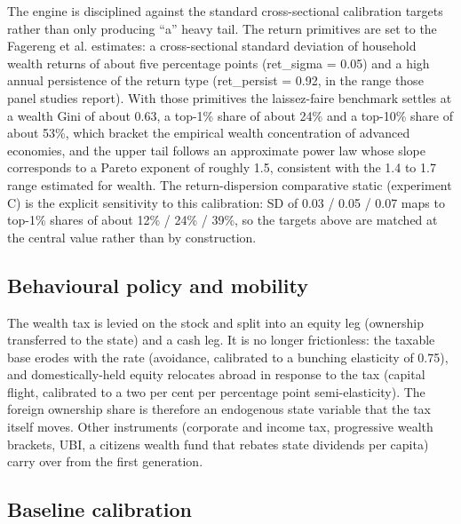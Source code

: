 \documentclass[12pt]{article}
\begin{document}
The engine is disciplined against the standard cross-sectional
calibration targets rather than only producing ``a'' heavy tail. The
return primitives are set to the Fagereng et al. estimates: a
cross-sectional standard deviation of household wealth returns of about
five percentage points (ret\_sigma = 0.05) and a high annual persistence
of the return type (ret\_persist = 0.92, in the range those panel
studies report). With those primitives the laissez-faire benchmark
settles at a wealth Gini of about 0.63, a top-1\% share of about 24\%
and a top-10\% share of about 53\%, which bracket the empirical wealth
concentration of advanced economies, and the upper tail follows an
approximate power law whose slope corresponds to a Pareto exponent of
roughly 1.5, consistent with the 1.4 to 1.7 range estimated for wealth.
The return-dispersion comparative static (experiment C) is the explicit
sensitivity to this calibration: SD of 0.03 / 0.05 / 0.07 maps to
top-1\% shares of about 12\% / 24\% / 39\%, so the targets above are
matched at the central value rather than by construction.

\hypertarget{behavioural-policy-and-mobility}{%
\subsection{Behavioural policy and
mobility}\label{behavioural-policy-and-mobility}}

The wealth tax is levied on the stock and split into an equity leg
(ownership transferred to the state) and a cash leg. It is no longer
frictionless: the taxable base erodes with the rate (avoidance,
calibrated to a bunching elasticity of 0.75), and domestically-held
equity relocates abroad in response to the tax (capital flight,
calibrated to a two per cent per percentage point semi-elasticity). The
foreign ownership share is therefore an endogenous state variable that
the tax itself moves. Other instruments (corporate and income tax,
progressive wealth brackets, UBI, a citizens\textquotesingle{} wealth
fund that rebates state dividends per capita) carry over from the first
generation.

\hypertarget{baseline-calibration}{%
\subsection{Baseline calibration}\label{baseline-calibration}}
\end{document}
